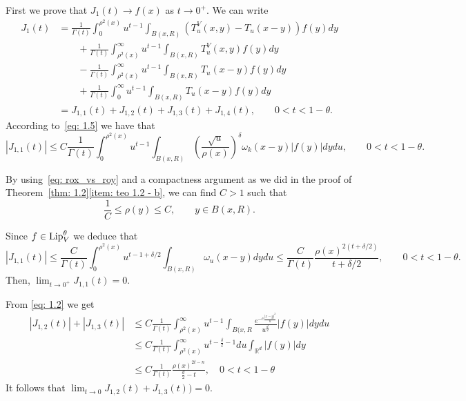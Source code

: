 \documentclass[10pt, a4paper, reqno]{amsart}
\theoremstyle{definition}
\theoremstyle{remark}
\newcommand{\Lip}{\textup{Lip}}
\numberwithin{equation}{section}
\begin{document}
First we prove that $J_1(t) \rightarrow f(x)$ as $t\rightarrow 0^+$. We can write
\begin{equation*}
    \begin{split}
        J_1(t) & = \frac{1}{\Gamma(t)} \int_0^{\rho^2(x)} u^{t-1} \int_{B(x,R)} \left( T_u^V(x,y) - T_u(x-y)\right) f(y) dy
        \\ & \qquad + \frac{1}{\Gamma(t)} \int_{\rho^2(x)}^\infty u^{t-1} \int_{B(x,R)}  T_u^V(x,y)  f(y) dy
        \\ & \qquad - \frac{1}{\Gamma(t)} \int_{\rho^2(x)}^\infty u^{t-1} \int_{B(x,R)}  T_u(x-y)  f(y) dy
        \\ & \qquad + \frac{1}{\Gamma(t)} \int_{0}^\infty u^{t-1} \int_{B(x,R)}  T_u(x-y)  f(y) dy
        \\ & = J_{1,1}(t) +J_{1,2}(t) + J_{1,3}(t) + J_{1,4}(t), \qquad 0<t<1-\theta.
    \end{split}
\end{equation*}
According to~\eqref{eq: 1.5} we have that
\[ |J_{1,1}(t)| \leq C \frac{1}{\Gamma(t)}
\int_0^{\rho^2(x)} u^{t-1} \int_{B(x,R)} \left(\frac{\sqrt{u}}{\rho(x)} \right)^\delta \omega_k(x-y) |f(y)| dy du, \qquad 0<t<1-\theta.\]

By using~\eqref{eq: rox_vs_roy} and a compactness argument as we did in the proof of Theorem~\ref{thm: 1.2}\ref{item: teo 1.2 - b}, we can find $C>1$ such that
\[\frac{1}{C} \leq \rho(y)\leq C, \qquad y\in B(x,R).\]

Since $f\in \Lip_V^\theta$ we deduce that
\[
|J_{1,1}(t)| \leq \frac{C}{\Gamma(t)} \int_0^{\rho^2(x)} u^{t-1+\delta/2} \int_{B(x,R)} \omega_u(x-y) dy du \leq \frac{C}{\Gamma(t)} \frac{\rho(x)^{2(t+\delta/2)}}{t+\delta/2}, \qquad 0<t<1-\theta.
\]
Then, $\displaystyle\lim_{t\rightarrow 0^+} J_{1,1}(t) = 0$. 

From \eqref{eq: 1.2} we get
\begin{align*}
    \left|J_{1,2}(t)\right|+ \left|J_{1,3}(t)\right| &\leq  C\frac{1}{\Gamma(t)}\int_{\rho^2(x)}^\infty u^{t-1}\int_{B(x,R}\frac{e^{-c\frac{|x-y|^2}{u}}}{u^{\frac{d}{2}}}|f(y)|dydu\\
    & \leq  C\frac{1}{\Gamma(t)} \int_{\rho^2(x)}^\infty u^{t- \frac{\delta}{2}-1}du \int_{\mathbb R^d} |f(y)|dy \\
    & \leq  C \frac{1}{\Gamma(t)}\frac{\rho(x)^{2t-n}}{\frac{d}{2}-t},\quad 0<t<1-\theta 
\end{align*}
It follows that $\displaystyle\lim_{t\rightarrow 0}J_{1,2}(t)+J_{1,3}(t))=0$.
\end{document}
